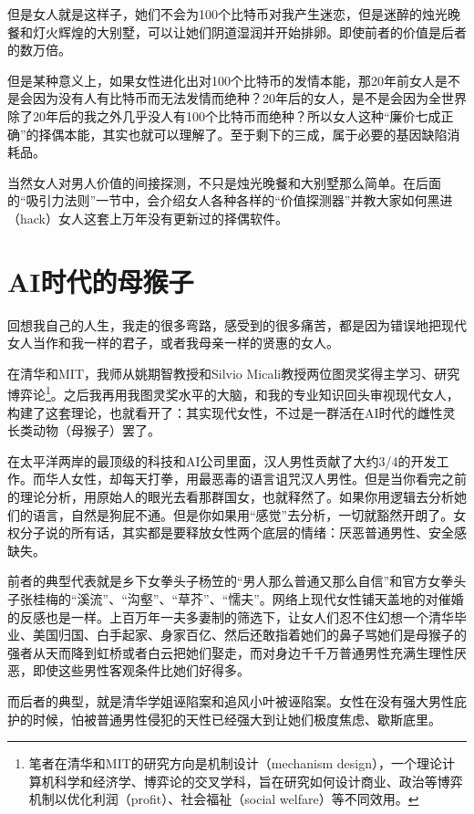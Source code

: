 但是女人就是这样子，她们不会为100个比特币对我产生迷恋，但是迷醉的烛光晚餐和灯火辉煌的大别墅，可以让她们阴道湿润并开始排卵。即使前者的价值是后者的数万倍。

但是某种意义上，如果女性进化出对100个比特币的发情本能，那20年前女人是不是会因为没有人有比特币而无法发情而绝种？20年后的女人，是不是会因为全世界除了20年后的我之外几乎没人有100个比特币而绝种？所以女人这种``廉价七成正确''的择偶本能，其实也就可以理解了。至于剩下的三成，属于必要的基因缺陷消耗品。

当然女人对男人价值的间接探测，不只是烛光晚餐和大别墅那么简单。在后面的``吸引力法则''一节中，会介绍女人各种各样的``价值探测器''并教大家如何黑进（hack）女人这套上万年没有更新过的择偶软件。

\section{AI时代的母猴子}

回想我自己的人生，我走的很多弯路，感受到的很多痛苦，都是因为错误地把现代女人当作和我一样的君子，或者我母亲一样的贤惠的女人。

在清华和MIT，我师从姚期智教授和Silvio Micali教授两位图灵奖得主学习、研究博弈论\footnote{笔者在清华和MIT的研究方向是机制设计（mechanism design），一个理论计算机科学和经济学、博弈论的交叉学科，旨在研究如何设计商业、政治等博弈机制以优化利润（profit）、社会福祉（social welfare）等不同效用。}。之后我再用我图灵奖水平的大脑，和我的专业知识回头审视现代女人，构建了这套理论，也就看开了：其实现代女性，不过是一群活在AI时代的雌性灵长类动物（母猴子）罢了。

在太平洋两岸的最顶级的科技和AI公司里面，汉人男性贡献了大约3/4的开发工作。而华人女性，却每天打拳，用最恶毒的语言诅咒汉人男性。但是当你看完之前的理论分析，用原始人的眼光去看那群国女，也就释然了。如果你用逻辑去分析她们的语言，自然是狗屁不通。但是你如果用``感觉''去分析，一切就豁然开朗了。女权分子说的所有话，其实都是要释放女性两个底层的情绪：厌恶普通男性、安全感缺失。

前者的典型代表就是乡下女拳头子杨笠的``男人那么普通又那么自信''和官方女拳头子张桂梅的``溪流''、``沟壑''、``草芥''、``懦夫''。网络上现代女性铺天盖地的对催婚的反感也是一样。上百万年一夫多妻制的筛选下，让女人们忍不住幻想一个清华毕业、美国归国、白手起家、身家百亿、然后还敢指着她们的鼻子骂她们是母猴子的强者从天而降到虹桥或者白云把她们娶走，而对身边千千万普通男性充满生理性厌恶，即使这些男性客观条件比她们好得多。

而后者的典型，就是清华学姐诬陷案和追风小叶被诬陷案。女性在没有强大男性庇护的时候，怕被普通男性侵犯的天性已经强大到让她们极度焦虑、歇斯底里。

